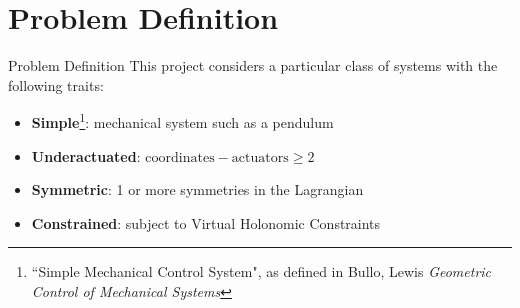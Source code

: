 \documentclass[xcolor=dvipsnames]{beamer}
\renewcommand{\cite}[1]{\footnote<.->[frame]{\fullcite{#1}}}
\begin{document}
\section{Problem Definition}
\begin{frame}{Problem Definition}
This project considers a particular class of systems with the following traits:
\begin{itemize}
    \item \textbf{Simple}\footnote{``Simple Mechanical Control System", as defined in Bullo, Lewis \textsl{Geometric Control of Mechanical Systems}}: mechanical system such as a pendulum
    \item \textbf{Underactuated}: $\mathrm{coordinates}-\mathrm{actuators}\geq 2$
    \item \textbf{Symmetric}: 1 or more symmetries in the Lagrangian
    \item \textbf{Constrained}: subject to Virtual Holonomic Constraints
\end{itemize}
\end{frame}

\end{document}
